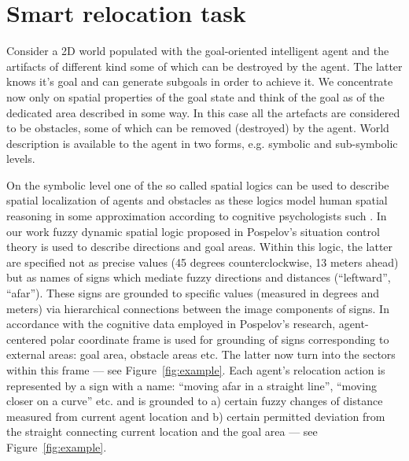 \documentclass[procedia]{easychair}
\begin{document}
\section{Smart relocation task}
\label{sect:smart}

Consider a 2D world populated with the goal-oriented intelligent agent and the artifacts of different kind some of which can be destroyed by the agent. The latter knows it's goal and can generate subgoals in order to achieve it. We concentrate now only on spatial properties of the goal state and think of the goal as of the dedicated area described in some way. In this case all the artefacts are considered to be obstacles, some of which can be removed (destroyed) by the agent. World description is available to the agent in two forms, e.g. symbolic and sub-symbolic levels. 

On the symbolic level one of the so called spatial logics can be used to describe spatial localization of agents and obstacles as these logics model human spatial reasoning in some approximation according to cognitive psychologists such \cite{Herskovits1997,Kuipers2000}. In our work fuzzy dynamic spatial logic \cite{Zadeh2012} proposed in Pospelov's situation control theory \cite{Osipov1997b} is used to describe directions and goal areas. Within this logic, the latter are specified not as precise values (45 degrees counterclockwise, 13 meters ahead) but as names of signs which mediate fuzzy directions and distances (``leftward'', ``afar''). These signs are grounded to specific values (measured in degrees and meters) via hierarchical connections between the image components of signs. In accordance with the cognitive data employed in Pospelov's research, agent-centered polar coordinate frame is used for grounding of signs corresponding to external areas: goal area, obstacle areas etc. The latter now turn into the sectors within this frame --- see Figure~\ref{fig:example}. Each agent's relocation action is represented by a sign with a name: ``moving afar in a straight line'', ``moving closer on a curve'' etc. and is grounded to a) certain fuzzy changes of distance measured from current agent location and b) certain permitted deviation from the straight connecting current location and the goal area --- see Figure~\ref{fig:example}.
\end{document}
